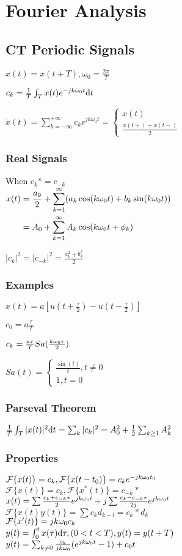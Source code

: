 \section{Fourier Analysis}
\subsection*{CT Periodic Signals}
$x(t)=x(t+T), \omega_0=\frac{2\pi}{T}$

$c_k=\frac 1 T \int_T x(t) e^{-jk\omega_0 t} \mathrm{d} t$

$\tilde{x}(t)=\sum_{k=-\infty}^{+\infty} c_k e^{jk\omega_0 t}=\begin{cases}x(t)\\ \frac{x(t+)+x(t-)}2\end{cases}$
\subsubsection*{Real Signals}
When $c_k*=c_{-k}$\\
$\begin{aligned}
x(t)&=\frac{a_0}{2} + \sum_{k=1}^{\infty} (a_k \cos(k\omega_0t)+b_k\sin(k \omega_0 t)) \\
&=A_0+\sum_{k=1}^{\infty} A_k\cos(k\omega_0 t+\phi_k)
\end{aligned}$

$|c_k|^2=|c_{-k}|^2=\frac{a_k^2+b_k^2}{2}$

\subsubsection*{Examples}
$x(t)=a[u(t+\frac\tau 2) - u(t-\frac\tau 2)]$

$c_0=a\frac\tau T$

$c_k=\frac{a\tau}{T} Sa(\frac{k\omega_0\tau}{2})$

$Sa(t)=\begin{cases}\frac{\sin(t)}{t}, t\ne 0\\1, t=0\end{cases}$

\subsubsection*{Parseval Theorem}

$\frac  1 T \int_T |x(t)|^2\mathrm{d} t = \sum_k |c_k|^2=A_0^2+\frac 1 2\sum_{k\ge 1} A_k^2$

\subsubsection*{Properties}
$\mathcal{F}\{x(t)\}=c_k,\mathcal{F}\{x(t-t_0)\}=c_ke^{-jk\omega_0 t_0}$\\
$\mathcal{F}\{x(t)\}=c_k,\mathcal{F}\{x^*(t)\}=c_{-k}*$\\
$x(t)= \sum \frac{c_k+c_{-k}*}{2}e^{jk\omega_0t} + j \sum \frac{c_k-c_{-k}*}{2j}e^{jk\omega_0t}$ \\
$\mathcal{F}\{x(t)y(t)\}=\sum c_kd_{k-l}=c_k*d_k$\\
$\mathcal{F}\{x'(t)\}=jk\omega_0c_k$\\
$y(t)=\int_0^{t}x(\tau)\mathrm{d} \tau, (0<t<T), y(t)=y(t+T)$\\$y(t)=\sum_{k\ne 0} \frac{c_k}{jk\omega_0}(e^{jk\omega_0 t} - 1) + c_0t$

